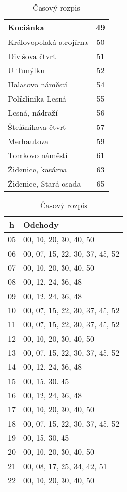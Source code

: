 \begin{table}[h]
\begin{minipage}{0.35\textwidth}
\begin{tabular}{|l|c|}
      Kociánka & 49 \\ \hline
      Královopolská strojírna & 50 \\ \hline
      Divišova čtvrť & 51 \\ \hline
      U Tunýlku & 52 \\ \hline
      Halasovo náměstí & 54 \\ \hline
      Poliklinika Lesná & 55 \\ \hline
      Lesná, nádraží & 56 \\ \hline
      Štefánikova čtvrť & 57 \\ \hline
      Merhautova & 59 \\ \hline
      Tomkovo náměstí & 61 \\ \hline
      Židenice, kasárna & 63 \\ \hline
      Židenice, Stará osada & 65 \\ \hline
    \end{tabular}
    \caption{Rozpis zastávok}      
  \end{minipage}
  \begin{minipage}{0.55\textwidth}
    \centering
    \begin{tabular}{|c|l|}
       \hline
        \textbf{h} & \textbf{Odchody} \\ \hline
        05 & 00, 10, 20, 30, 40, 50 \\ \hline
        06 & 00, 07, 15, 22, 30, 37, 45, 52 \\ \hline
        07 & 00, 10, 20, 30, 40, 50 \\ \hline
        08 & 00, 12, 24, 36, 48 \\ \hline
        09 & 00, 12, 24, 36, 48 \\ \hline
        10 & 00, 07, 15, 22, 30, 37, 45, 52 \\ \hline
        11 & 00, 07, 15, 22, 30, 37, 45, 52 \\ \hline
        12 & 00, 10, 20, 30, 40, 50 \\ \hline
        13 & 00, 07, 15, 22, 30, 37, 45, 52 \\ \hline
        14 & 00, 12, 24, 36, 48 \\ \hline
        15 & 00, 15, 30, 45 \\ \hline
        16 & 00, 12, 24, 36, 48 \\ \hline
        17 & 00, 10, 20, 30, 40, 50 \\ \hline
        18 & 00, 07, 15, 22, 30, 37, 45, 52 \\ \hline
        19 & 00, 15, 30, 45 \\ \hline
        20 & 00, 10, 20, 30, 40, 50 \\ \hline
        21 & 00, 08, 17, 25, 34, 42, 51 \\ \hline
        22 & 00, 10, 20, 30, 40, 50 \\ \hline
    \end{tabular}
    \caption{Časový rozpis}
  \end{minipage}
\end{table}
